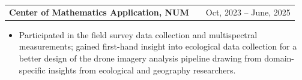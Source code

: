 \documentclass[a4paper,11pt]{article}
\makeatletter
\newenvironment{jobshort}[2]
    {
    \begin{tabularx}{\linewidth}{@{}l X r@{}}
    \textbf{#1} & \hfill &  #2 \\[3.75pt]
    \end{tabularx}
    }
    {
    }
\makeatother
\begin{document}
\begin{jobshort}{Center of Mathematics Application, NUM}{Oct, 2023 -- June, 2025}
\begin{itemize}[nosep,after=\strut,leftmargin=1em,itemsep=3pt,label=--]
    
    
    
    
    \item Participated in the field survey data collection and multispectral measurements; gained first-hand insight into ecological data collection for a better design of the drone imagery analysis pipeline drawing from domain-specific insights from ecological and geography researchers.


   







\end{itemize} 

\vspace{-1.5em}
\end{jobshort}

\end{document}
